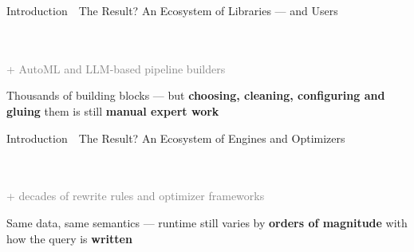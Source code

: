 \documentclass[aspectratio=169]{beamer}
\newcommand{\hred}[1]{\textcolor{tug}{\textbf{#1}}}
\newcommand{\apptitle}[3]{%
  \textcolor{#1}{#2}~\textcolor{black!30}{\textbar}~#3}
\begin{document}
\begin{frame}[t]{\apptitle{black!60}{Introduction}{The Result? An Ecosystem of Libraries --- and Users}}
\vspace{2mm}
\begin{center}
  \\[4mm]
  \\[4mm]

  {\footnotesize\textcolor{gray}{+ AutoML and LLM-based pipeline builders}}\\[2mm]
  \hspace{2mm}\hspace{2mm}\hspace{1mm}%
  \hspace{2mm}\hspace{2mm}\hspace{2mm}
\end{center}
\vspace{2mm}
\begin{alertblock}{}
  \centering
  Thousands of building blocks --- but \hred{choosing, cleaning, configuring and gluing}
  them is still \textbf{manual expert work}
\end{alertblock}
\end{frame}

\begin{frame}[t]{\apptitle{black!60}{Introduction}{The Result? An Ecosystem of Engines and Optimizers}}
\vspace{2mm}
\begin{center}
  \\[4mm]
  \\[4mm]

  {\footnotesize\textcolor{gray}{+ decades of rewrite rules and optimizer frameworks}}\\[2mm]
  \hspace{2mm}\hspace{2mm}\hspace{1mm}%
  \hspace{2mm}\hspace{2mm}
\end{center}
\vspace{2mm}
\begin{alertblock}{}
  \centering
  Same data, same semantics --- runtime still varies by \hred{orders of magnitude}
  with how the query is \textbf{written}
\end{alertblock}
\end{frame}
\end{document}

